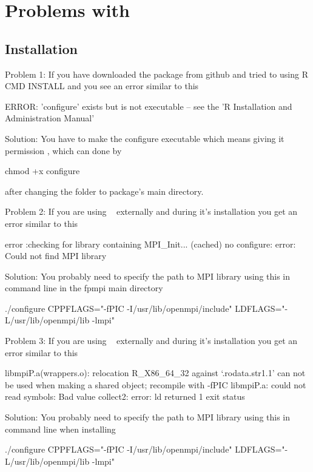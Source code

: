 \section{Problems with }
\label{sec:debug}


\subsection{Installation}

{\color{red}Problem 1:}  If you have downloaded the package from github and 
tried to using R CMD INSTALL  and you see an error similar to this
\begin{Output}
ERROR: 'configure' exists but is not executable -- see the 'R Installation and Administration Manual'
\end{Output}
{\color{dkgreen}Solution:}  You have to make the configure executable which 
means giving it permission , which can done by
\begin{Code}
chmod +x configure
\end{Code}
after changing the folder to package's main directory.

{\color{red}Problem 2:}  If you are using ~\citep{fpmpi} externally 
and during it's installation you get an error similar to this
\begin{Output}
error :checking for library containing MPI_Init... (cached) no configure: 
error: Could not find MPI library
\end{Output}
{\color{dkgreen}Solution:} You probably need to specify the path to MPI library using this in command line in the fpmpi main directory
\begin{Code}
./configure CPPFLAGS="-fPIC -I/usr/lib/openmpi/include" LDFLAGS="-L/usr/lib/openmpi/lib -lmpi"
\end{Code}

{\color{red}Problem 3:}  If you are using ~\citep{mpiP} externally
and during it's installation you get an error similar to this
\begin{Output}
libmpiP.a(wrappers.o): relocation R_X86_64_32 against `.rodata.str1.1' can not be used when making a shared object; recompile with -fPIC
libmpiP.a: could not read symbols: Bad value collect2: error: ld returned 1 exit status
\end{Output}
{\color{dkgreen}Solution:} You probably need to specify the path to MPI library
using this in command line when installing 
\begin{Code}
./configure CPPFLAGS="-fPIC -I/usr/lib/openmpi/include" LDFLAGS="-L/usr/lib/openmpi/lib -lmpi"
\end{Code}

